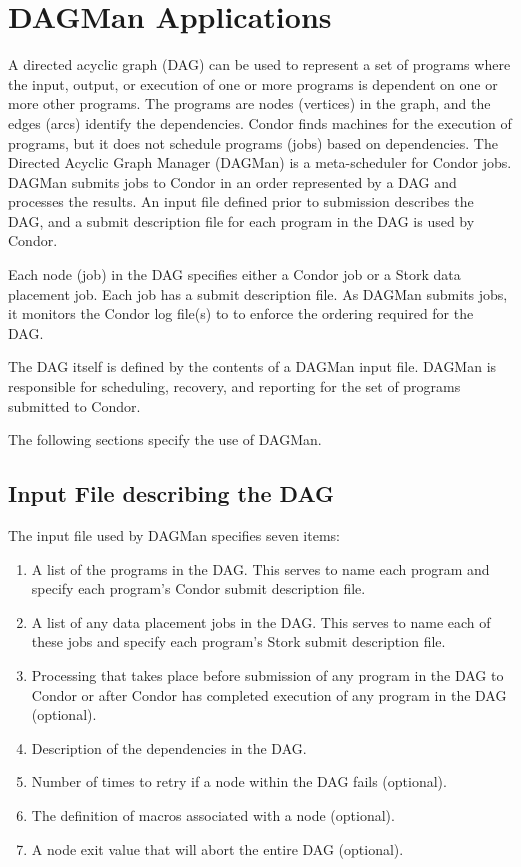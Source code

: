 \section{\label{sec:DAGMan}DAGMan Applications}

A directed acyclic graph (DAG) can be used to represent a set of programs
where the input, output, or execution of one or more programs
is dependent on one or more other programs.
The programs are nodes (vertices) in the graph,
and the edges (arcs) identify the dependencies.
Condor finds machines for the execution of programs, but it
does not schedule programs (jobs) based on dependencies.
The Directed Acyclic Graph Manager (DAGMan) is a meta-scheduler for Condor
jobs. 
DAGMan submits jobs to Condor in an order represented by
a DAG and processes the results.
An input file defined prior to submission describes the DAG, and
a submit description file for each program in the DAG
is used by Condor.

Each node (job) in the DAG specifies
either a Condor job or a Stork data placement job.
Each job has a submit description file.
As DAGMan submits jobs, it monitors the Condor log file(s) to 
to enforce the ordering required for the DAG.

The DAG itself is defined by the contents of a DAGMan input file.
DAGMan is responsible for scheduling, recovery, and reporting
for the set of programs submitted to Condor.

The following sections specify the use of DAGMan.

\subsection{Input File describing the DAG}

The input file used by DAGMan specifies seven items:
\begin{enumerate}
\item
A list of the programs in the DAG. This serves to name each program
and specify each program's Condor submit description file.
\item
A list of any data placement jobs in the DAG.
This serves to name each of these jobs and
specify each program's Stork submit description file.
\item
Processing that takes place before submission of
any program in the DAG to Condor or after Condor has completed execution
of any program in the DAG (optional).
\item
Description of the dependencies in the DAG.
\item
Number of times to retry if a node within the DAG fails (optional).
\item
The definition of macros associated with a node (optional).
\item
A node exit value that will abort the entire DAG (optional).
\end{enumerate}


